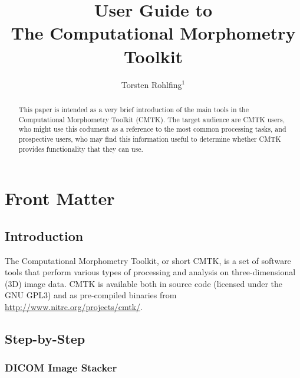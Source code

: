 \documentclass{InsightArticle}
\title{User Guide to \\[4mm] The Computational Morphometry Toolkit}
\author{Torsten Rohlfing$^{1}$}
\begin{document}
\ifpdf
\else
\fi


\maketitle


\ifhtml
\chapter*{Front Matter\label{front}}
\fi


\begin{abstract}
\noindent
This paper is intended as a very brief introduction of the main tools in the
Computational Morphometry Toolkit (CMTK). The target audience are CMTK users,
who might use this codument as a reference to the most common processing
tasks, and prospective users, who may find this information useful to
determine whether CMTK provides functionality that they can use.
\end{abstract}

\tableofcontents

\section{Introduction}

The Computational Morphometry Toolkit, or short CMTK, is a set of software
tools that perform various types of processing and analysis on
three-dimensional (3D) image data. CMTK is available both in source code
(licensed under the GNU GPL3) and as pre-compiled binaries from
\url{http://www.nitrc.org/projects/cmtk/}.


\section{Step-by-Step}

\subsection{DICOM Image Stacker}
\end{document}

